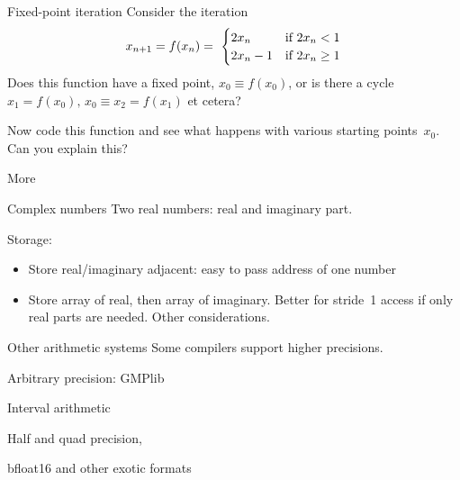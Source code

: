 \begin{exerciseframe}{Fixed-point iteration}
  Consider the iteration
  \[ x_{n+1}=f(x_n) = \
  \begin{cases}
    2x_n&\hbox{if $2x_n<1$}\\
    2x_n-1&\hbox{if $2x_n\geq 1$}\\
  \end{cases}
  \]
  Does this function have a fixed point, $x_0\equiv f(x_0)$, or is there a cycle
  $x_1=f(x_0),\,x_0\equiv x_2=f(x_1)$ et cetera?

  Now code this function and see what happens with various starting
  points~$x_0$. Can you explain this?
\end{exerciseframe}

 {More}

\begin{numberedframe}{Complex numbers}
Two real numbers: real and imaginary part.

Storage:
\begin{itemize}
\item Store real/imaginary adjacent: easy to pass address of one
  number
\item Store array of real, then array of imaginary. Better for
  stride~1 access if only real parts are needed. Other considerations.
\end{itemize}
\end{numberedframe}

\begin{numberedframe}{Other arithmetic systems}
Some compilers support higher precisions.

Arbitrary precision: GMPlib

Interval arithmetic

Half and quad precision,

bfloat16 and other exotic formats
\end{numberedframe}


